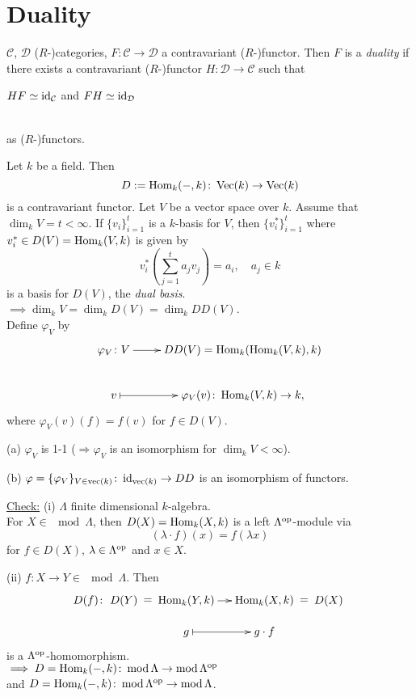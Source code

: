 
\section{Duality}
\begin{defin}
$\mathcal{C}$, $\mathcal{D}$ ($R$-)categories, $F\colon \mathcal{C} \to
\mathcal{D}$ a contravariant ($R$-)functor. Then $F$ is a
\emph{duality} if there exists a contravariant ($R$-)functor $H:
\mathcal{D} \to \mathcal{C}$ such that \\ 
\centerline{$HF \simeq \operatorname{id}\nolimits_\mathcal{C}$ and $FH \simeq
  \operatorname{id}\nolimits_\mathcal{D}$}\\ 
as ($R$-)functors.
\end{defin}

Let $k$ be a field.  Then 
\[ D:= \operatorname{Hom}_k(-,k)\colon \operatorname{Vec}\nolimits(k) \to \operatorname{Vec}\nolimits(k) \] 
is a contravariant functor.  Let $V$ be a vector space over $k$.
Assume that $\dim_k V = t < \infty$. If $\{ v_i \}^t_{i=1}$ is a
$k$-basis for $V$, then $\{ v_i^*\}_{i=1}^t$ where $v_i^* \in D(V) =
\operatorname{Hom}_k(V, k)$ is given by 
\[v_i^*\left(\sum_{j=1}^t a_jv_j\right) = a_i, \quad a_j \in k\]
is a basis for $D(V)$, the \emph{dual basis}.\\ 
$\implies \dim_k V = \dim_k D(V) = \dim_k DD(V)$.\\
Define $\varphi_V$ by 
\[\xymatrix{
\varphi_V \colon V \ar[r] & DD(V) = \Hom_k(\Hom_k(V, k), k)\\
            v \ar@{|->}[r]& \varphi_V(v) \colon \Hom_k(V, k) \to k, 
}\]
where $\varphi_V(v)(f) = f(v)$ for $f \in D(V)$. 

\begin{exer}
(a) $\varphi_V$ is 1-1 ($\Rightarrow \varphi_V$ is an isomorphism for
$\dim_k V < \infty$). 

(b) $\varphi = \{ \varphi_V \}_{V \in \operatorname{vec}\nolimits(k)} \colon \operatorname{id}\nolimits_{\operatorname{vec}\nolimits(k)} \to DD$ is an isomorphism of functors.
\end{exer}

\underline{Check:}
(i) $\Lambda$ finite dimensional $k$-algebra.\\
For $X \in \mod \Lambda$, then $D(X) = \operatorname{Hom}_k(X, k)$ is a left $\Lambda^{{\operatorname{op}\nolimits}}$-module via
\[ (\lambda \cdot f)(x) = f(\lambda x) \] for $f \in D(X)$, $\lambda \in \Lambda^{{\operatorname{op}\nolimits}}$ and $x \in X$.

(ii) $f\colon X \to Y \in \mod \Lambda$. Then \[D(f)\colon \xymatrix@C-1pc@R-1pc{
D(Y) \ar@{}[r]|-*[@]{=}& \Hom_k(Y, k) \ar[r]& \Hom_k(X, k)\ar@{}[r]|-*[@]{=} & D(X)\\
&g \ar@{|->}[r]& g\cdot f&}\] is a $\Lambda^{{\operatorname{op}\nolimits}}$-homomorphism.\\
$\implies D = \operatorname{Hom}_k(-,k)\colon \operatorname{mod}\nolimits\Lambda \to \operatorname{mod}\nolimits\Lambda^{{\operatorname{op}\nolimits}}$\\ 
and $D = \operatorname{Hom}_k(-,k)\colon \operatorname{mod}\nolimits\Lambda^{{\operatorname{op}\nolimits}} \to \operatorname{mod}\nolimits\Lambda$. 

